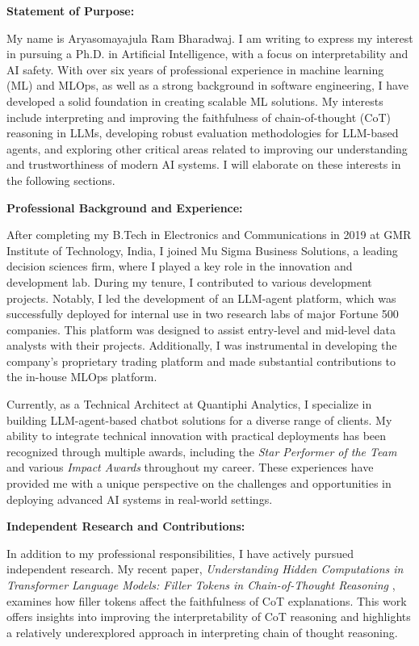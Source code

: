 \documentclass[12pt]{article}
\begin{document}
\textbf{Statement of Purpose:}

My name is Aryasomayajula Ram Bharadwaj. I am writing to express my interest in pursuing a Ph.D. in Artificial Intelligence, with a focus on interpretability and AI safety. With over six years of professional experience in machine learning (ML) and MLOps, as well as a strong background in software engineering, I have developed a solid foundation in creating scalable ML solutions. My interests include interpreting and improving the faithfulness of chain-of-thought (CoT) reasoning in LLMs, developing robust evaluation methodologies for LLM-based agents, and exploring other critical areas related to improving our understanding and trustworthiness of modern AI systems. I will elaborate on these interests in the following sections.

\textbf{Professional Background and Experience:}

After completing my B.Tech in Electronics and Communications in 2019 at GMR Institute of Technology, India, I joined Mu Sigma Business Solutions, a leading decision sciences firm, where I played a key role in the innovation and development lab. During my tenure, I contributed to various development projects. Notably, I led the development of an LLM-agent platform, which was successfully deployed for internal use in two research labs of major Fortune 500 companies. This platform was designed to assist entry-level and mid-level data analysts with their projects. Additionally, I was instrumental in developing the company's proprietary trading platform and made substantial contributions to the in-house MLOps platform.

Currently, as a Technical Architect at Quantiphi Analytics, I specialize in building LLM-agent-based chatbot solutions for a diverse range of clients. My ability to integrate technical innovation with practical deployments has been recognized through multiple awards, including the \emph{Star Performer of the Team} and various \emph{Impact Awards} throughout my career. These experiences have provided me with a unique perspective on the challenges and opportunities in deploying advanced AI systems in real-world settings.

\newpage
\textbf{Independent Research and Contributions:}

In addition to my professional responsibilities, I have actively pursued independent research. My recent paper, \emph{Understanding Hidden Computations in Transformer Language Models: Filler Tokens in Chain-of-Thought Reasoning} \cite{bharadwaj2024}, examines how filler tokens affect the faithfulness of CoT explanations. This work offers insights into improving the interpretability of CoT reasoning and highlights a relatively underexplored approach in interpreting chain of thought reasoning.
\end{document}
